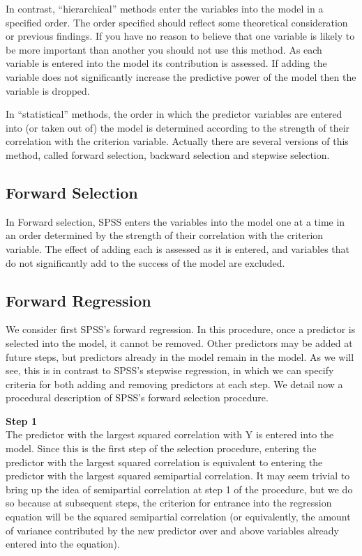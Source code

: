 \documentclass[a4paper,12pt]{article}
\begin{document}
In contrast, “hierarchical” methods enter the variables into the model in a specified order. The order specified should reflect some theoretical consideration or previous
findings. If you have no reason to believe that one variable is likely to be more important than another you should not use this method. As each variable is entered into the model its contribution is assessed. If adding the variable does not significantly increase the predictive power of the model then the variable is
dropped.

In “statistical” methods, the order in which the predictor variables are entered into (or taken out of) the model is determined according to the strength of their correlation with the criterion variable. Actually there are several versions of this method, called forward selection, backward selection and stepwise selection.

\subsection{Forward Selection}
In Forward selection, SPSS enters the variables into the model one at a time in an
order determined by the strength of their correlation with the criterion variable. The effect of adding each is assessed as it is entered, and variables that do not significantly add to the success of the model are excluded.

\subsection{Forward Regression}
We consider first SPSS’s forward regression. In this procedure, once a predictor is selected into the model, it cannot be removed. Other predictors may be added at future steps, but predictors already in the model remain in the model. As we will see, this is in contrast to SPSS’s stepwise regression, in which we can specify criteria for both adding and removing predictors at each step.
We detail now a procedural description of SPSS’s forward selection procedure.

\textbf{Step 1}\\
The predictor with the largest squared correlation with Y is entered into the model. Since this is the first step of the selection procedure, entering the predictor with the largest squared correlation is equivalent to entering the predictor with the largest squared semipartial correlation. It may seem trivial to bring up the idea of semipartial correlation at step 1 of the procedure, but we do so because at subsequent steps, the criterion for entrance into the regression equation will be the squared semipartial correlation (or equivalently, the amount of variance contributed by the new predictor over and above variables already entered into the equation).
\end{document}
